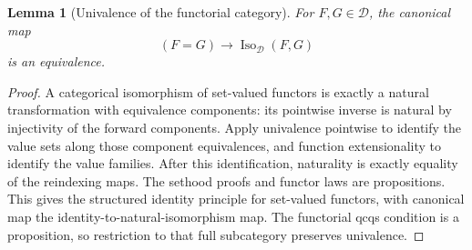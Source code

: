 \documentclass[11pt]{amsart}
\newtheorem{lemma}[theorem]{Lemma}
\theoremstyle{definition}\newtheorem{definition}[theorem]{Definition}
\theoremstyle{remark}\newtheorem{remark}[theorem]{Remark}
\begin{document}
\begin{lemma}[Univalence of the functorial category]
For $F,G\in\mathcal D$, the canonical map
\[
 (F=G)\longrightarrow\operatorname{Iso}_{\mathcal D}(F,G)
\]
is an equivalence.
\end{lemma}
\begin{proof}
A categorical isomorphism of set-valued functors is exactly a natural
transformation with equivalence components: its pointwise inverse is
natural by injectivity of the forward components. Apply univalence
pointwise to identify the value sets along those component equivalences,
and function extensionality to identify the value families. After this
identification, naturality is exactly equality of the reindexing maps.
The sethood proofs and functor laws are propositions. This gives the
structured identity principle for set-valued functors, with canonical
map the identity-to-natural-isomorphism map. The functorial qcqs condition
is a proposition, so restriction to that full subcategory preserves
univalence.
\end{proof}
\end{document}
